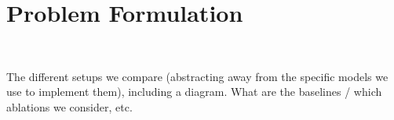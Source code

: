 
\section{Problem Formulation}
\label{sec:problem}

\\

The different setups we compare (abstracting away from the specific models we use to implement them), including a diagram. What are the baselines / which ablations we consider, etc.
